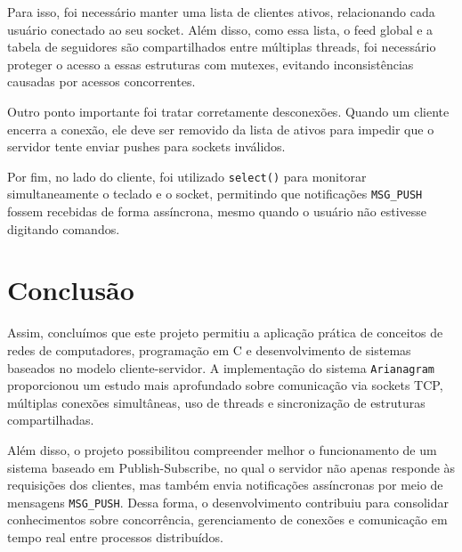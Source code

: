 Para isso, foi necessário manter uma lista de clientes ativos, relacionando cada usuário conectado ao seu socket. Além disso, como essa lista, o feed global e a tabela de seguidores são compartilhados entre múltiplas threads, foi necessário proteger o acesso a essas estruturas com mutexes, evitando inconsistências causadas por acessos concorrentes.

Outro ponto importante foi tratar corretamente desconexões. Quando um cliente encerra a conexão, ele deve ser removido da lista de ativos para impedir que o servidor tente enviar pushes para sockets inválidos.

Por fim, no lado do cliente, foi utilizado \texttt{select()} para monitorar simultaneamente o teclado e o socket, permitindo que notificações \texttt{MSG\_PUSH} fossem recebidas de forma assíncrona, mesmo quando o usuário não estivesse digitando comandos.

\section{Conclusão}

Assim, concluímos que este projeto permitiu a aplicação prática de conceitos de redes de computadores, programação em C e desenvolvimento de sistemas baseados no modelo cliente-servidor. A implementação do sistema \texttt{Arianagram} proporcionou um estudo mais aprofundado sobre comunicação via sockets TCP, múltiplas conexões simultâneas, uso de threads e sincronização de estruturas compartilhadas.

Além disso, o projeto possibilitou compreender melhor o funcionamento de um sistema baseado em Publish-Subscribe, no qual o servidor não apenas responde às requisições dos clientes, mas também envia notificações assíncronas por meio de mensagens \texttt{MSG\_PUSH}. Dessa forma, o desenvolvimento contribuiu para consolidar conhecimentos sobre concorrência, gerenciamento de conexões e comunicação em tempo real entre processos distribuídos.